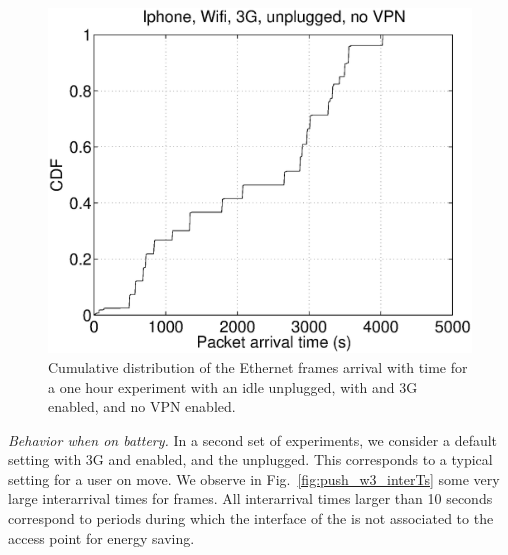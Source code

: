 

\begin{figure}
\centering
        \includegraphics[width=0.8\linewidth]{../../code/pushNotification/Fig/bw_iphone_wifi_3g_unplug_novpn_ts.eps}
  \caption{Cumulative distribution of the Ethernet frames
          arrival with time for a one hour experiment with an idle
          \iphone{} unplugged, with \wifi{} and 3G enabled, and no VPN
          enabled.}
  \label{fig:push_w3_ts}
\end{figure}

\emph{Behavior when on battery.} 
In a second set of experiments, we consider a default \iphone{}
setting with 3G and \wifi{} enabled, and the \iphone{} unplugged. This
corresponds to a typical setting for a user on move.  We observe in
Fig.~\ref{fig:push_w3_interTs} some very large interarrival
times for frames. All interarrival times larger than 10 seconds correspond to
periods during which the \wifi interface of the \iphone{} is not
associated to the access point for energy saving. 




